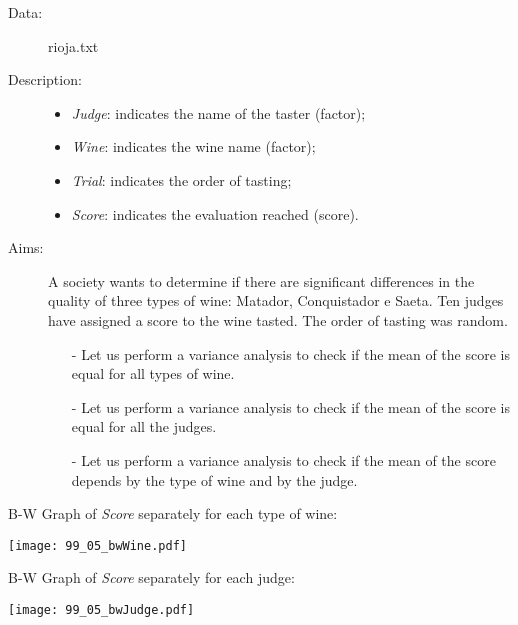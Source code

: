 \begin{frame}
  \begin{description}
    \item[Data: ]rioja.txt \\ 
    \item[Description: ]
      \begin{footnotesize}
        \begin{itemize}
          \item \textit{Judge}: indicates the name of the taster (factor);
          \item \textit{Wine}: indicates the wine name (factor);
          \item \textit{Trial}: indicates the order of tasting;
          \item \textit{Score}: indicates the evaluation reached (score).
        \end{itemize}
      \end{footnotesize}
    \item[Aims: ]
      \begin{footnotesize}
        A society wants to determine if there are significant differences in the quality of three types of wine: Matador, Conquistador e Saeta. Ten judges have assigned a score to the wine tasted. The order of tasting was random.
      \begin{itemize}
          \item[-] Let us perform a variance analysis to check if the mean of the score is equal for all types of wine.
          \item[-] Let us perform a variance analysis to check if the mean of the score is equal for all the judges.
          \item[-] Let us perform a variance analysis to check if the mean of the score depends by the type of wine and by the judge.
        \end{itemize}
      \end{footnotesize}
  \end{description}
\end{frame}

\begin{frame}
  B-W Graph of \textit{Score} separately for each type of wine:\\
  \begin{center}
    \texttt{[image: 99\_05\_bwWine.pdf]}
  \end{center}
\end{frame}

\begin{frame}
  B-W Graph of \textit{Score} separately for each judge:\\
  \vspace{-1cm}
  \begin{center}
    \texttt{[image: 99\_05\_bwJudge.pdf]}
  \end{center}
\end{frame}

